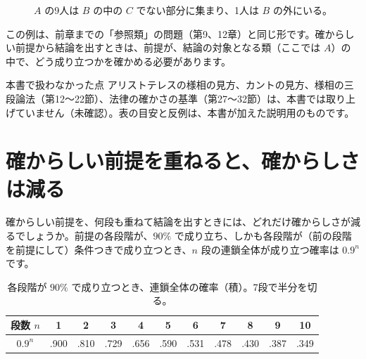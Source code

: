 \documentclass[a4paper,11pt,openany]{ltjsbook}
\begin{document}
\begin{figure}[htbp]
\centering
{}
\caption{$A$ の9人は $B$ の中の $C$ でない部分に集まり、1人は $B$ の外にいる。}
\end{figure}

この例は、前章までの「参照類」の問題（第9、12章）と同じ形です。確からしい前提から結論を出すときは、前提が、結論の対象となる類（ここでは $A$）の中で、どう成り立つかを確かめる必要があります。

\begin{notebox}{本書で扱わなかった点}
アリストテレスの様相の見方、カントの見方、様相の三段論法（第12〜22節）、法律の確かさの基準（第27〜32節）は、本書では取り上げていません（未確認）。表の目安と反例は、本書が加えた説明用のものです。
\end{notebox}

\section{確からしい前提を重ねると、確からしさは減る}

確からしい前提を、何段も重ねて結論を出すときには、どれだけ確からしさが減るでしょうか。前提の各段階が、$90\%$ で成り立ち、しかも各段階が（前の段階を前提にして）条件つきで成り立つとき、$n$ 段の連鎖全体が成り立つ確率は $0.9^n$ です。

\begin{table}[htbp]
\centering
\small
\begin{tabular}{c|cccccccccc}
\toprule
段数 $n$ & 1 & 2 & 3 & 4 & 5 & 6 & 7 & 8 & 9 & 10\\
\midrule
$0.9^n$ & .900 & .810 & .729 & .656 & .590 & .531 & .478 & .430 & .387 & .349\\
\bottomrule
\end{tabular}
\caption{各段階が $90\%$ で成り立つとき、連鎖全体の確率（積）。7段で半分を切る。}
\end{table}
\end{document}
